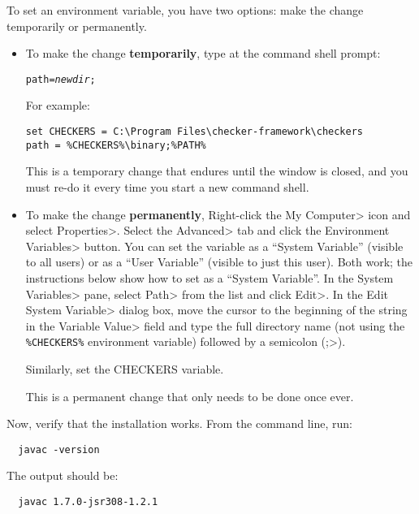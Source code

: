 \begin{enumerate}

To set an environment variable, you have two options:  make the change
temporarily or permanently.
\begin{itemize}
\item
To make the change \textbf{temporarily}, type at the command shell prompt:

\begin{alltt}
path = \emph{newdir};%PATH%
\end{alltt}

For example:

\begin{Verbatim}
set CHECKERS = C:\Program Files\checker-framework\checkers
path = %CHECKERS%\binary;%PATH%
\end{Verbatim}

This is a temporary change that endures until the window is closed, and you
must re-do it every time you start a new command shell.

\item
To make the change \textbf{permanently},
Right-click the \<My Computer> icon and
select \<Properties>. Select the \<Advanced> tab and click the
\<Environment Variables> button. You can set the variable as a ``System
Variable'' (visible to all users) or as a ``User Variable'' (visible to
just this user).  Both work; the instructions below show how to set as a
``System Variable''.
In the \<System Variables> pane, select
\<Path> from the list and click \<Edit>. In the \<Edit System Variable>
dialog box, move the cursor to the beginning of the string in the
\<Variable Value> field and type the full directory name (not using the
\verb|%CHECKERS%| environment variable) followed by a
semicolon (\<;>).

Similarly, set the CHECKERS variable.

This is a permanent change that only needs to be done once ever.
\end{itemize}



Now, verify that the installation works.  From the command line, run:

\begin{Verbatim}
  javac -version
\end{Verbatim}

The output should be:

\begin{Verbatim}
  javac 1.7.0-jsr308-1.2.1
\end{Verbatim}

\end{enumerate}


